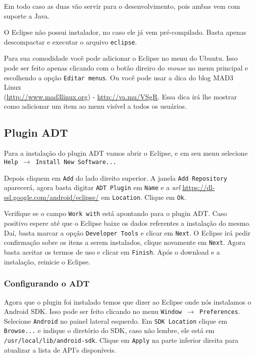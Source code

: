 Em todo caso as duas vão servir para o desenvolvimento, pois ambas vem com suporte a Java.

O Eclipse não possui instalador, no caso ele já vem pré-compilado. Basta apenas descompactar e executar
o arquivo \texttt{eclipse}.

Para sua comodidade você pode adicionar o Eclipse no menu do Ubuntu. Isso pode ser feito apenas clicando
com o botão direiro do \textit{mouse} no menu principal e escolhendo a opção \texttt{Editar menus}. Ou você pode
usar a dica do blog MAD3 Linux \\ (\url{http://www.mad3linux.org}) - \url{http://va.mu/VSgR}. Essa dica irá
lhe mostrar como adicionar um item ao menu visível a todos os usuários.

\subsection{Plugin ADT}

Para a instalação do plugin ADT vamos abrir o Eclipse, e em seu menu selecione \texttt{Help $\rightarrow$
Install New Software...}

Depois cliquem em \texttt{Add} do lado direito superior. A janela \texttt{Add Repository} aparecerá,
agora basta digitar \texttt{ADT Plugin} em \texttt{Name} e a \textit{url}
\url{https://dl-ssl.google.com/android/eclipse/} em \texttt{Location}. Clique em \texttt{Ok}.

Verifique se o campo \texttt{Work with} está apontando para o plugin ADT. Caso positivo espere até que
o Eclipse baixe os dados referentes a instalação do mesmo. Daí, basta marcar a opção
\texttt{Developer Tools} e clicar em \texttt{Next}. O Eclipse irá pedir confirmação sobre os itens
a serem instalados, clique novamente em \texttt{Next}. Agora basta aceitar os termos de uso e clicar em
\texttt{Finish}. Após o download e a instalação, reinicie o Eclipse.

\subsubsection{Configurando o ADT}

Agora que o plugin foi instalado temos que dizer ao Eclipse onde nós instalamos o Android SDK. Isso
pode ser feito clicando no menu \texttt{Window $\rightarrow$ Preferences}. Selecione \texttt{Android} no painel
lateral esquerdo. Em \texttt{SDK Location} clique em \texttt{Browse...} e indique o diretório do SDK,
caso não lembre, ele está em \texttt{/usr/local/lib/android-sdk}. Clique em \texttt{Apply} na parte inferior
direita para atualizar a lista de API's disponíveis.

